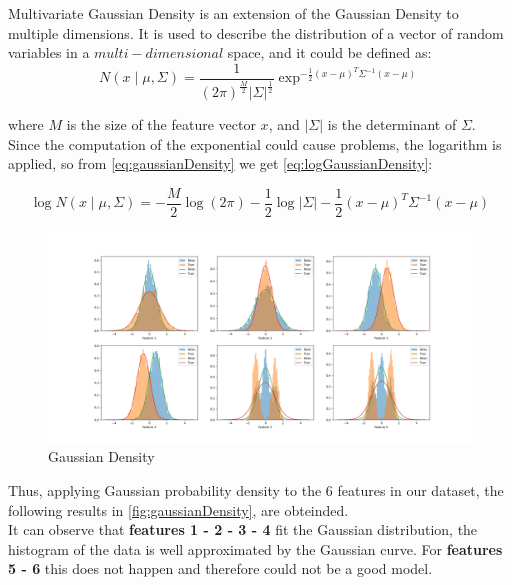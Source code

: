 
Multivariate Gaussian Density is an extension of the Gaussian Density to multiple dimensions.
It is used to describe the distribution of a vector of random variables in a \(multi-dimensional\) space,
and it could be defined as:
\begin{equation}
    N(x\mid\mu, \Sigma) = \frac{1}{(2\pi)^{\frac{M}{2}} \left|\Sigma \right|^{\frac{1}{2}}}\exp^{-\frac{1}{2}(x-\mu)^T\Sigma^{-1}(x-\mu)}
    \label{eq:gaussianDensity}
\end{equation}

where \(M\) is the size of the feature vector \(x\), and \(\left|\Sigma \right|\) is the determinant of \(\Sigma\).
Since the computation of the exponential could cause problems, the logarithm is applied, so from \autoref{eq:gaussianDensity}
we get \autoref{eq:logGaussianDensity}:

\begin{equation}
    \log N(x\mid\mu, \Sigma) = -\frac{M}{2}\log(2\pi) - \frac{1}{2}\log\left|\Sigma \right| - \frac{1}{2}(x-\mu)^T\Sigma^{-1}(x-\mu)
    \label{eq:logGaussianDensity}
\end{equation}

\begin{figure}[h]
    \centering
    \includegraphics[width=1\linewidth]{Lab/04. Lab 04/Images/01. GaussianDensity}
    \caption{Gaussian Density}
    \label{fig:gaussianDensity}
\end{figure}

Thus, applying Gaussian probability density to the 6 features in our dataset, the following results in \autoref{fig:gaussianDensity},
are obteinded.\\
It can observe that \textbf{features 1 - 2 - 3 - 4} fit the Gaussian distribution,  the histogram of the data is well
approximated by the Gaussian curve.
For \textbf{features 5 - 6} this does not happen and therefore could not be a good model.
